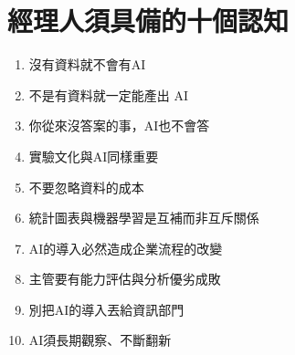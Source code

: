\documentclass[a4paper,12pt]{article}
\begin{document}
\section{經理人須具備的十個認知}
\label{sec:orgc15d3ad}
\begin{enumerate}
\item 沒有資料就不會有AI\\
\item 不是有資料就一定能產出 AI\\
\item 你從來沒答案的事，AI也不會答\\
\item 實驗文化與AI同樣重要\\
\item 不要忽略資料的成本\\
\item 統計圖表與機器學習是互補而非互斥關係\\
\item AI的導入必然造成企業流程的改變\\
\item 主管要有能力評估與分析優劣成敗\\
\item 別把AI的導入丟給資訊部門\\
\item AI須長期觀察、不斷翻新\\
\end{enumerate}
\end{document}
